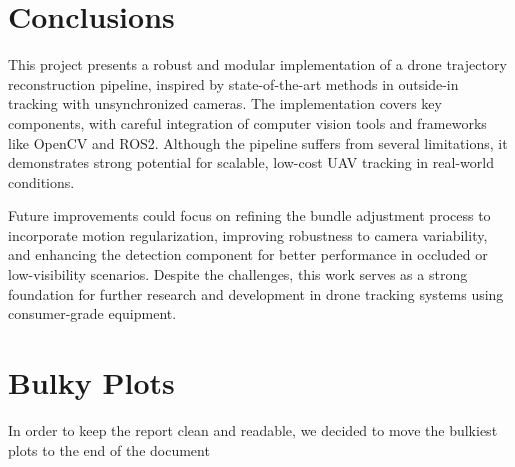 \documentclass[11pt]{article}
\begin{document}
\section{Conclusions}

This project presents a robust and modular implementation of a drone trajectory reconstruction pipeline, inspired by state-of-the-art methods in outside-in tracking with unsynchronized cameras. The implementation covers key components, with careful integration of computer vision tools and frameworks like OpenCV and ROS2. Although the pipeline suffers from several limitations, it demonstrates strong potential for scalable, low-cost UAV tracking in real-world conditions.

Future improvements could focus on refining the bundle adjustment process to incorporate motion regularization, improving robustness to camera variability, and enhancing the detection component for better performance in occluded or low-visibility scenarios. Despite the challenges, this work serves as a strong foundation for further research and development in drone tracking systems using consumer-grade equipment.

\section*{Bulky Plots}

In order to keep the report clean and readable, we decided to move the bulkiest plots to the end of the document
\end{document}
